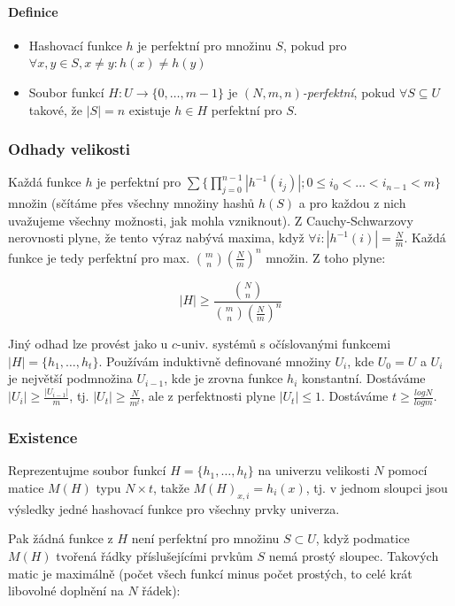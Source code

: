 \documentclass[11pt]{report} %
\numberwithin{equation}{section}
\begin{document}
\paragraph{Definice}\label{definice}

\begin{itemize}
	
	\item
	Hashovací funkce $h$ je perfektní pro množinu $S$, pokud
	pro $\forall x,y\in S, x\neq y: h(x)\neq h(y)$
	\item
	Soubor funkcí $H:U\to \{0,\dots,m-1\}$ je
	$(N,m,n)$\emph{-perfektní}, pokud $\forall S\subseteq U$
	takové, že $|S|=n$ existuje $h\in H$ perfektní pro
	$S$.
\end{itemize}

\subsubsection{Odhady velikosti}\label{odhady-velikosti}

Každá funkce $h$ je perfektní pro
$\sum\{\prod_{j=0}^{n-1}|h^{-1}(i_j)|;0\leq i_0<\dots<i_{n-1}<m\}$
množin (sčítáme přes všechny množiny hashů $h(S)$ a pro každou z
nich uvažujeme všechny možnosti, jak mohla vzniknout). Z
Cauchy-Schwarzovy nerovnosti plyne, že tento výraz nabývá maxima, když
$\forall i: |h^{-1}(i)|=\frac{N}{m}$. Každá funkce je tedy
perfektní pro max. $\mathbf{}\binom{m}{n}(\frac{N}{m})^n$ množin.
Z toho plyne:

$$|H|\geq \frac{\mathbf{}\binom{N}{n}}{\mathbf{}\binom{m}{n}\left(\frac{N}{m}\right)^n}$$

Jiný odhad lze provést jako u $c$-univ. systémů s očíslovanými
funkcemi $|H|=\{h_1,\dots,h_t\}$. Používám induktivně definované
množiny $U_i$, kde $U_0 = U$ a $U_i$ je největší
podmnožina $U_{i-1}$, kde je zrovna funkce $h_i$ konstantní.
Dostáváme $|U_i|\geq \frac{|U_{i-1}|}{m}$, tj.
$|U_t| \geq \frac{N}{m^t}$, ale z perfektnosti plyne
$|U_t|\leq 1$. Dostáváme $t\geq \frac{log N}{log m}$.

\subsubsection{Existence}\label{existence}

Reprezentujme soubor funkcí $H=\{h_1,\dots,h_t\}$ na univerzu
velikosti $N$ pomocí matice $M(H)$ typu $N\times t$,
takže $M(H)_{x,i}=h_i(x)$, tj. v jednom sloupci jsou výsledky
jedné hashovací funkce pro všechny prvky univerza.

Pak žádná funkce z $H$ není perfektní pro množinu
$S\subset U$, když podmatice $M(H)$ tvořená řádky
příslušejícími prvkům $S$ nemá prostý sloupec. Takových matic je
maximálně (počet všech funkcí minus počet prostých, to celé krát
libovolné doplnění na $N$ řádek):
\end{document}
